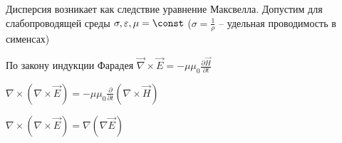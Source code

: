 \documentclass[12pt]{article}
\begin{document}


Дисперсия возникает как следствие уравнение Максвелла. Допустим для слабопроводящей среды $\sigma, \varepsilon, \mu = \const$ ($\sigma = \frac{1}{\rho}$ -- удельная проводимость в сименсах)

По закону индукции Фарадея $\vec\nabla \times \vec E = -\mu\mu_0 \frac{\partial \vec H}{\partial t}$

$\nabla \times (\nabla \times \vec E) = -\mu\mu_0 \frac{\partial}{\partial t} (\nabla \times \vec H)$

$\nabla \times (\nabla \times \vec E) = \nabla (\nabla \vec E)$
\end{document}

